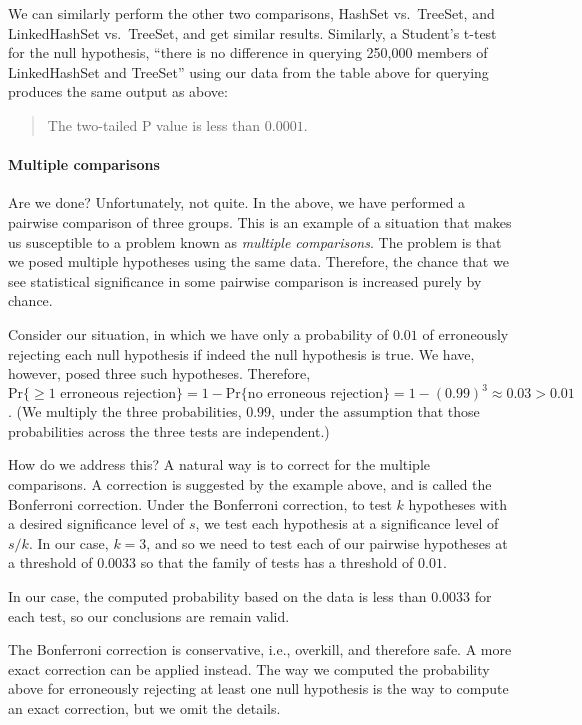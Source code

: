 We can similarly perform the other two comparisons,
HashSet vs.~TreeSet, and LinkedHashSet vs.~TreeSet, and get
similar results. Similarly, a Student's t-test for the
null hypothesis, ``there is no difference in querying 250,000
members of LinkedHashSet and TreeSet'' using our data from
the table above for querying produces the same output as above:
\begin{quote}
    The two-tailed P value is less than $0.0001$.
\end{quote}

\paragraph{Multiple comparisons} Are we done? Unfortunately, not
quite. In the above, we have performed a pairwise comparison
of three groups. This is an example of a situation that makes
us susceptible to a problem known as \emph{multiple comparisons}.
The problem is that we posed multiple hypotheses using the same
data. Therefore, the chance that we see statistical significance
in some pairwise comparison is increased purely by chance.

Consider our situation, in which we have only a probability of
$0.01$ of erroneously rejecting each null hypothesis if indeed
the null hypothesis is true. We have, however, posed three
such hypotheses. Therefore,
$\text{Pr}\{\ge 1 \text{ erroneous rejection}\} =
1 - \text{Pr}\{\text{no erroneous rejection}\} =
1 - (0.99)^3 \approx 0.03 > 0.01$. (We multiply the three
probabilities, $0.99$, under the assumption that those
probabilities across the three tests are independent.)

How do we address this? A natural way is to correct
for the multiple comparisons. A correction is suggested
by the example above, and is called the Bonferroni
correction. Under the Bonferroni correction, to test
$k$ hypotheses with a desired significance level of
$s$, we test each hypothesis at a significance level
of $s/k$. In our case, $k=3$, and so we need to test
each of our pairwise hypotheses at a threshold of
$0.0033$ so that the family of tests has a threshold
of $0.01$.

In our case, the computed probability
based on the data is less than $0.0033$ for each test,
so our conclusions are remain valid.

The Bonferroni correction is conservative, i.e.,
overkill, and therefore safe. A more exact
correction can be applied instead. The way we computed the
probability above for erroneously rejecting at least
one null hypothesis is the way to compute an exact
correction, but we omit the details.





